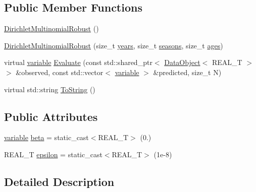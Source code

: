\subsection*{Public Member Functions}
\begin{DoxyCompactItemize}
\item 
\hyperlink{structmas_1_1_dirichlet_multinomial_robust_a9bda6773230596f595c6102350b6dc5b}{Dirichlet\-Multinomial\-Robust} ()
\item 
\hyperlink{structmas_1_1_dirichlet_multinomial_robust_a45404473a44ea179c9d01fd8d75c56a8}{Dirichlet\-Multinomial\-Robust} (size\-\_\-t \hyperlink{structmas_1_1_n_l_l_functor_ac76e5d7e0808486b42ffdaea952dd19f}{years}, size\-\_\-t \hyperlink{structmas_1_1_n_l_l_functor_ac59c36239b1817b5bb357bf90dc4802d}{seasons}, size\-\_\-t \hyperlink{structmas_1_1_n_l_l_functor_aa70e461c812bff95770cda5dbb79b6b9}{ages})
\item 
virtual \hyperlink{structmas_1_1_dirichlet_multinomial_robust_ae46add67af1698359eaf6317847f42f1}{variable} \hyperlink{structmas_1_1_dirichlet_multinomial_robust_accc5e689e123bac3c30a8f54240f63d7}{Evaluate} (const std\-::shared\-\_\-ptr$<$ \hyperlink{structmas_1_1_data_object}{Data\-Object}$<$ R\-E\-A\-L\-\_\-\-T $>$ $>$ \&observed, const std\-::vector$<$ \hyperlink{structmas_1_1_dirichlet_multinomial_robust_ae46add67af1698359eaf6317847f42f1}{variable} $>$ \&predicted, size\-\_\-t N)
\item 
virtual std\-::string \hyperlink{structmas_1_1_dirichlet_multinomial_robust_a25f3b78a3072162c8e1fce217a599a14}{To\-String} ()
\end{DoxyCompactItemize}
\subsection*{Public Attributes}
\begin{DoxyCompactItemize}
\item 
\hyperlink{structmas_1_1_dirichlet_multinomial_robust_ae46add67af1698359eaf6317847f42f1}{variable} \hyperlink{structmas_1_1_dirichlet_multinomial_robust_a5b440cc461e06eb9abbc824fbf9dacff}{beta} = static\-\_\-cast$<$R\-E\-A\-L\-\_\-\-T$>$ (0.)
\item 
R\-E\-A\-L\-\_\-\-T \hyperlink{structmas_1_1_dirichlet_multinomial_robust_a7f16f0414a3ad99ca01df8e9df5a0785}{epsilon} = static\-\_\-cast$<$R\-E\-A\-L\-\_\-\-T$>$ (1e-\/8)
\end{DoxyCompactItemize}


\subsection{Detailed Description}
